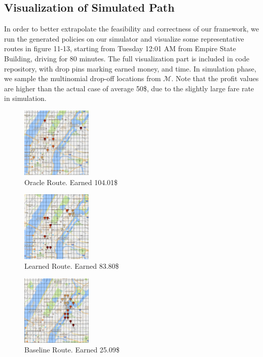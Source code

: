 \documentclass[letterpaper, 10 pt, conference]{ieeeconf}
\begin{document}
\subsection{Visualization of Simulated Path}
In order to better extrapolate the feasibility and correctness of our framework, we run the generated policies on our simulator and visualize some representative routes in figure 11-13, starting from Tuesday 12:01 AM from Empire State Building, driving for 80 minutes. The full visualization part is included in  code repository, with drop pins marking earned money, and time. In simulation phase, we sample the multinomial drop-off locations from $\mathcal{M}$. Note that the profit values are  higher than the actual case of average 50\$, due to the slightly large fare rate in simulation.
\begin{figure}
\centering
\includegraphics[width=0.3\textwidth]{oracle.png}
\caption{Oracle Route. Earned 104.01\$}
\end{figure}
\begin{figure}
\centering
\includegraphics[width=0.3\textwidth]{learned.png}
\caption{Learned Route. Earned 83.80\$}
\end{figure}
\begin{figure}
\centering
\includegraphics[width=0.3\textwidth]{baseline.png}
\caption{Baseline Route. Earned 25.09\$}
\end{figure}
\end{document}
